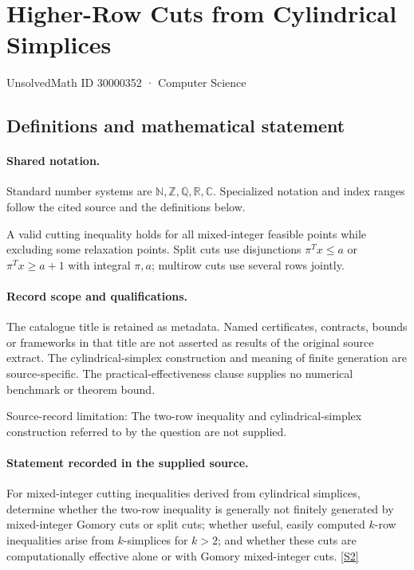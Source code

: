 \documentclass[11pt]{article}
\newcommand{\sref}[2]{\hyperlink{source:#1:#2}{[S#2]}}
\begin{document}
\setcounter{section}{30000351}
\section{Higher-Row Cuts from Cylindrical Simplices}\label{30000352}
{\small\sffamily UnsolvedMath ID 30000352 · Computer Science}
\subsection{Definitions and mathematical statement}

\paragraph{Shared notation.}Standard number systems are $\mathbb N,\mathbb Z,\mathbb Q,\mathbb R,\mathbb C$. Specialized notation and index ranges follow the cited source and the definitions below.


A valid cutting inequality holds for all mixed-integer feasible points while excluding some relaxation points. Split cuts use disjunctions $\pi^Tx\leq a$ or $\pi^Tx\geq a+1$ with integral $\pi,a$; multirow cuts use several rows jointly.
\paragraph{Record scope and qualifications.}
The catalogue title is retained as metadata. Named certificates, contracts, bounds or frameworks in that title are not asserted as results of the original source extract.
The cylindrical-simplex construction and meaning of finite generation are source-specific. The practical-effectiveness clause supplies no numerical benchmark or theorem bound.

Source-record limitation: The two-row inequality and cylindrical-simplex construction referred to by the question are not supplied.
\paragraph{Statement recorded in the supplied source.}
For mixed-integer cutting inequalities derived from cylindrical simplices, determine whether the two-row inequality is generally not finitely generated by mixed-integer Gomory cuts or split cuts; whether useful, easily computed $k$-row inequalities arise from $k$-simplices for $k>2$; and whether these cuts are computationally effective alone or with Gomory mixed-integer cuts. \sref{30000352}{2}
\end{document}
